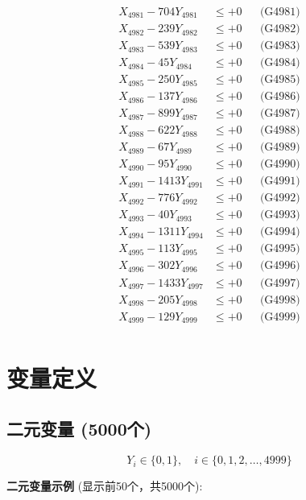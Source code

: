 \documentclass[a4paper,10pt]{article}
\begin{document}
{\begin{align}
\allowbreak
X_{4981} - 704Y_{4981} &\leq +0 && \text{(G4981)} \\
X_{4982} - 239Y_{4982} &\leq +0 && \text{(G4982)} \\
X_{4983} - 539Y_{4983} &\leq +0 && \text{(G4983)} \\
X_{4984} - 45Y_{4984} &\leq +0 && \text{(G4984)} \\
X_{4985} - 250Y_{4985} &\leq +0 && \text{(G4985)} \\
X_{4986} - 137Y_{4986} &\leq +0 && \text{(G4986)} \\
X_{4987} - 899Y_{4987} &\leq +0 && \text{(G4987)} \\
X_{4988} - 622Y_{4988} &\leq +0 && \text{(G4988)} \\
X_{4989} - 67Y_{4989} &\leq +0 && \text{(G4989)} \\
X_{4990} - 95Y_{4990} &\leq +0 && \text{(G4990)} \\
\allowbreak
X_{4991} - 1413Y_{4991} &\leq +0 && \text{(G4991)} \\
X_{4992} - 776Y_{4992} &\leq +0 && \text{(G4992)} \\
X_{4993} - 40Y_{4993} &\leq +0 && \text{(G4993)} \\
X_{4994} - 1311Y_{4994} &\leq +0 && \text{(G4994)} \\
X_{4995} - 113Y_{4995} &\leq +0 && \text{(G4995)} \\
X_{4996} - 302Y_{4996} &\leq +0 && \text{(G4996)} \\
X_{4997} - 1433Y_{4997} &\leq +0 && \text{(G4997)} \\
X_{4998} - 205Y_{4998} &\leq +0 && \text{(G4998)} \\
X_{4999} - 129Y_{4999} &\leq +0 && \text{(G4999)} \\
\end{align}
}

\section{变量定义}

\subsection{二元变量 (5000个)}

\begin{equation}
Y_i \in \{0,1\}, \quad i \in \{0, 1, 2, \ldots, 4999\}
\end{equation}

\textbf{二元变量示例} (显示前50个，共5000个):
\end{document}
